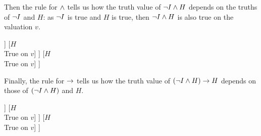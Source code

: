 Then the rule for $\mathbin{\wedge}$ tells us how the truth value of $\neg I\mathbin{\wedge} H$ depends on the truths of $\neg I$ and $H$: as $\neg I$ is true and $H$ is true, then $\neg I \mathbin{\wedge} H$ is also true on the valuation $v$.
\begin{center}
	\begin{forest}
		[$(\enot I\eand H)\mainconnective{\eif} H$\\
		[$(\enot I\mainconnective{\eand} H)$\\True on $v$
		[$\mainconnective{\enot} I$\\True on $v$
		[$I$\\False on $v$]
		]
		[$H$\\True on $v$]
		]
		[$H$\\True on $v$]
		]
	\end{forest}
\end{center}
Finally, the rule for $\rightarrow$ tells us how the truth value of $(\neg I\mathbin{\wedge} H)\rightarrow H$ depends on those of $(\neg I\mathbin{\wedge} H)$ and $H$.
\begin{center}
	\begin{forest}
		[$(\enot I\eand H)\mainconnective{\eif} H$\\True on $v$
		[$(\enot I\mainconnective{\eand} H)$\\True on $v$
		[$\mainconnective{\enot} I$\\True on $v$
		[$I$\\False on $v$]
		]
		[$H$\\True on $v$]
		]
		[$H$\\True on $v$]
		]
	\end{forest}
\end{center}

